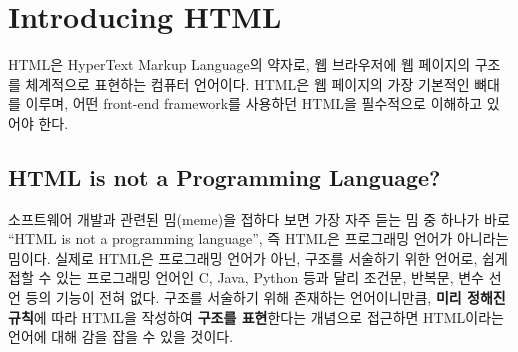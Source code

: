 \section{Introducing HTML} \label{sect:introducing-html}

HTML은 HyperText Markup Language의 약자로, 웹 브라우저에 웹 페이지의 구조를 체계적으로 표현하는 컴퓨터 언어이다. HTML은 웹 페이지의 가장 기본적인 뼈대를 이루며, 어떤 front-end framework를 사용하던 HTML을 필수적으로 이해하고 있어야 한다.

\subsection*{HTML is not a Programming Language?}

소프트웨어 개발과 관련된 밈(meme)을 접하다 보면 가장 자주 듣는 밈 중 하나가 바로 ``HTML is not a programming language'', 즉 HTML은 프로그래밍 언어가 아니라는 밈이다. 실제로 HTML은 프로그래밍 언어가 아닌, 구조를 서술하기 위한 언어로, 쉽게 접할 수 있는 프로그래밍 언어인 C, Java, Python 등과 달리 조건문, 반복문, 변수 선언 등의 기능이 전혀 없다. 구조를 서술하기 위해 존재하는 언어이니만큼, \textbf{미리 정해진 규칙}에 따라 HTML을 작성하여 \textbf{구조를 표현}한다는 개념으로 접근하면 HTML이라는 언어에 대해 감을 잡을 수 있을 것이다.

    {}
